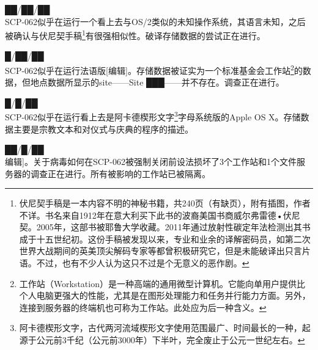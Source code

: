 ██\slash ██\slash ██\\
SCP-062似乎在运行一个看上去与OS\slash 2类似的未知操作系统，其语言未知，之后被确认与伏尼契手稿\footnote{伏尼契手稿是一本内容不明的神秘书籍，共240页（有缺页），附有插图，作者不详。书名来自1912年在意大利买下此书的波裔美国书商威尔弗雷德•伏尼契。2005年，这部书被耶鲁大学收藏。2011年通过放射性碳定年法检测出其书成于十五世纪初。这份手稿被发现以来，专业和业余的译解密码员，如第二次世界大战期间的英美顶尖解码专家等都曾积极研究它，但是未能破译出只言片语。不过，也有不少人认为这只不过是个无意义的恶作剧。}有很强相似性。破译存储数据的尝试正在进行。

█\slash ██\slash ██\\
SCP-062似乎在运行法语版{[}编辑]。存储数据被证实为一个标准基金会工作站\footnote{工作站（Workstation）是一种高端的通用微型计算机。它能向单用户提供比个人电脑更强大的性能，尤其是在图形处理能力和任务并行能力方面。另外，连接到服务器的终端机也可称为工作站。此处应为后一种含义。}的数据，但地点数据所显示的site——Site ███——并不存在。调查正在进行。

█\slash █\slash ██\\
SCP-062似乎在运行看上去是阿卡德楔形文字\footnote{阿卡德楔形文字，古代两河流域楔形文字使用范围最广、时间最长的一种，起源于公元前3千纪（公元前3000年）下半叶，完全废止于公元一世纪左右。}字母系统版的Apple OS X。存储数据主要是宗教文本和对仪式与庆典的程序的描述。

██\slash █\slash ██\\
\bb{描述：}{[}编辑]。关于病毒如何在SCP-062被强制关闭前设法损坏了3个工作站和1个文件服务器的调查正在进行。所有被影响的工作站已被隔离。

\hr
